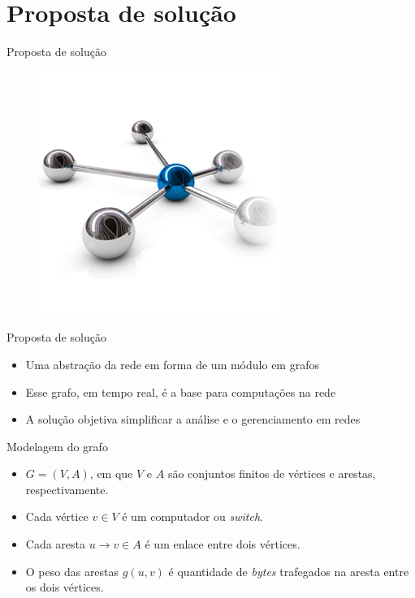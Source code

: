 \section{Proposta de solução}

\begin{frame}{Proposta de solução}

    \begin{figure}[h]
        \centering
        \includegraphics[scale=.8]{images/small-graph}
    \end{figure}
\end{frame}

\begin{frame}{Proposta de solução}
    
    \begin{itemize}
        \setlength{\itemsep}{.5cm}
        \item Uma abstração da rede em forma de um módulo em grafos 
        \item Esse grafo, em tempo real, é a base para computações na rede
        \item A solução objetiva simplificar a análise e o gerenciamento 
            em redes
    \end{itemize}

\end{frame}

\begin{frame}{Modelagem do grafo}

    \begin{itemize}
        \setlength{\itemsep}{.5cm}
        \item $G=(V, A)$, em que $V$ e $A$ são conjuntos finitos de vértices 
            e arestas, respectivamente.
        \item Cada vértice $v \in V$ é um computador ou \emph{switch}.
        \item Cada aresta $u \to v \in A$ é um enlace entre dois vértices.
        \item O peso das arestas $g(u, v)$ é quantidade de \emph{bytes} 
            trafegados na aresta entre os dois vértices.
    \end{itemize}
\end{frame}

